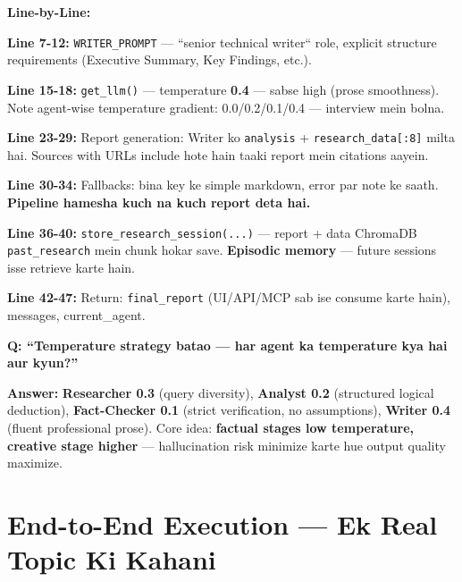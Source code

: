 \documentclass[11pt, a4paper]{article}
\begin{document}
\begin{codestorybox}
\textbf{Line-by-Line:}

\textbf{Line 7-12:} \texttt{WRITER\_PROMPT} --- ``senior technical writer`` role, explicit structure requirements (Executive Summary, Key Findings, etc.).

\textbf{Line 15-18:} \texttt{get\_llm()} --- temperature \textbf{0.4} --- sabse high (prose smoothness). Note agent-wise temperature gradient: 0.0/0.2/0.1/0.4 --- interview mein bolna.

\textbf{Line 23-29:} Report generation: Writer ko \texttt{analysis} + \texttt{research\_data[:8]} milta hai. Sources with URLs include hote hain taaki report mein citations aayein.

\textbf{Line 30-34:} Fallbacks: bina key ke simple markdown, error par note ke saath. \textbf{Pipeline hamesha kuch na kuch report deta hai.}

\textbf{Line 36-40:} \texttt{store\_research\_session(...)} --- report + data ChromaDB \texttt{past\_research} mein chunk hokar save. \textbf{Episodic memory} --- future sessions isse retrieve karte hain.

\textbf{Line 42-47:} Return: \texttt{final\_report} (UI/API/MCP sab ise consume karte hain), messages, current\_agent.
\end{codestorybox}

\begin{interviewbox}
\textbf{Q: ``Temperature strategy batao --- har agent ka temperature kya hai aur kyun?''}

\textbf{Answer:} \textbf{Researcher 0.3} (query diversity), \textbf{Analyst 0.2} (structured logical deduction), \textbf{Fact-Checker 0.1} (strict verification, no assumptions), \textbf{Writer 0.4} (fluent professional prose). Core idea: \textbf{factual stages low temperature, creative stage higher} --- hallucination risk minimize karte hue output quality maximize.
\end{interviewbox}

\newpage

\section{End-to-End Execution --- Ek Real Topic Ki Kahani}
\end{document}
